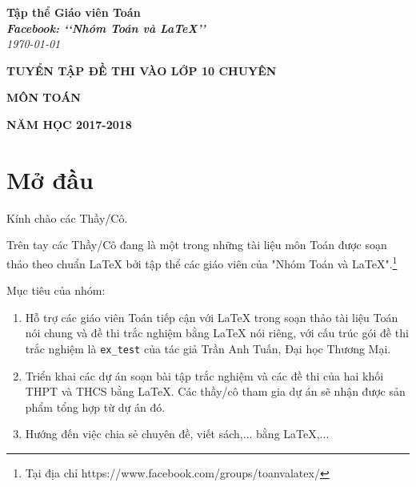 \documentclass[12pt,a4paper,oneside]{book}
\renewcommand{\baselinestretch}{1.4}
\begin{document}
\providecommand*{\dx}{\ensuremath{\mathrm{\,d}}x}
\providecommand*{\unit}[1]{\ensuremath{\mathrm{\,#1}}}

\begin{titlepage}
\begin{flushright}
\fontsize{17}{0}\selectfont
\textbf{Tập thể Giáo viên Toán}\\
\textbf{\textit{Facebook: \lq\lq Nhóm Toán và LaTeX\rq\rq}}\\
\textit{\color{red}\today}
\end{flushright}

\vspace{4cm}

\begin{flushright}

\vspace{1cm}

 \textbf{\fontsize{30}{0}\selectfont T\fontsize{20}{0}\selectfont UYỂN TẬP ĐỀ THI VÀO LỚP 10 CHUYÊN}
 
 \vspace{1cm}
 
 \textbf{\fontsize{35}{0}\selectfont MÔN TOÁN}
\end{flushright}

\vfill{
\begin{flushright}
\fontsize{17}{0}\textbf{NĂM HỌC 2017-2018}
\end{flushright}
}
\end{titlepage}
\pagestyle{empty}
\renewcommand{\headrulewidth}{0.4pt}

{\renewcommand{\baselinestretch}{1.3}
\tableofcontents
}

\pagestyle{fancy}
\lhead{\empty}
\rhead{\empty}
\lfoot{\currfilename}
\chapter*{Mở đầu}
Kính chào các Thầy/Cô.

\vspace{0.6cm}

\noindent Trên tay các Thầy/Cô đang là một trong những tài liệu môn Toán được soạn thảo theo chuẩn \LaTeX{} bởi tập thể các giáo viên của "Nhóm Toán và LaTeX".\footnote{Tại địa chỉ https://www.facebook.com/groups/toanvalatex/}

\vspace{0.6cm}

\noindent Mục tiêu của nhóm: 
\begin{enumerate}
\item Hỗ trợ các giáo viên Toán tiếp cận với \LaTeX{} trong soạn thảo tài liệu Toán nói chung và đề thi trắc nghiệm bằng \LaTeX{} nói riêng, với cấu trúc gói đề thi trắc nghiệm là \texttt{ex\_test} của tác giả Trần Anh Tuấn, Đại học Thương Mại.
\item Triển khai các dự án soạn bài tập trắc nghiệm và các đề thi của hai khối THPT và THCS bằng \LaTeX{}. Các thầy/cô tham gia dự án sẽ nhận được sản phẩm tổng hợp từ dự án đó.
\item Hướng đến việc chia sẻ chuyên đề, viết sách,... bằng \LaTeX,...
\end{enumerate}
\end{document}

